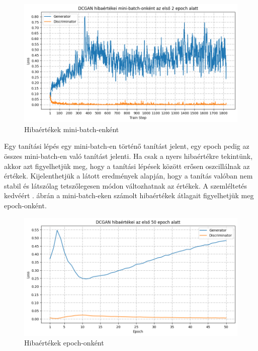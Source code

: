 \begin{figure}[h]
\centering
\includegraphics[width=15cm]{images/miniloss.png}
\caption{Hibaértékek mini-batch-enként}
\label{fig:mini-batch_loss_plot}
\end{figure}

Egy tanítási lépés egy mini-batch-en történő tanítást jelent, egy epoch pedig az összes mini-batch-en való tanítást jelenti.
Ha csak a nyers hibaértékre tekintünk, akkor azt figyelhetjük meg, hogy a tanítási lépések között erősen oszcillálnak az értékek. Kijelenthetjük a látott eredmények alapján, hogy a tanítás valóban nem stabil és látszólag tetszőlegesen módon változhatnak az értékek.
A szemléltetés kedvéért . ábrán a mini-batch-eken számolt hibaértékek átlagait figyelhetjük meg epoch-onként.

\begin{figure}[h]
\centering
\includegraphics[width=15cm]{images/epochloss.png}
\caption{Hibaértékek epoch-onként}
\label{fig:epoch_loss_plot}
\end{figure}

